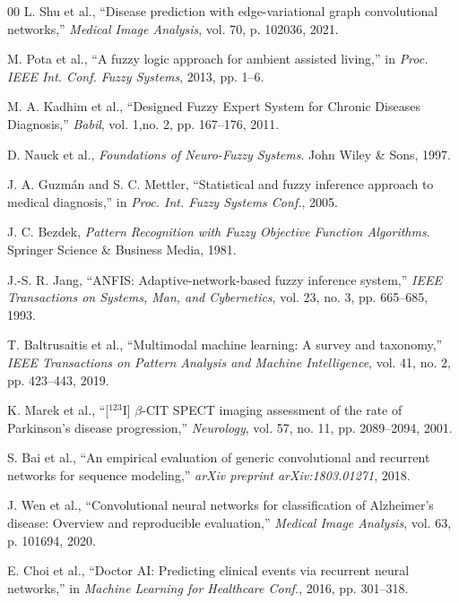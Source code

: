 \documentclass[journal,twoside,web]{ieeecolor}
\begin{document}
\begin{thebibliography}{00}
L. Shu et al., ``Disease prediction with edge-variational graph convolutional networks,'' \textit{Medical Image Analysis}, vol. 70, p. 102036, 2021.

M. Pota et al., ``A fuzzy logic approach for ambient assisted living,'' in \textit{Proc. IEEE Int. Conf. Fuzzy Systems}, 2013, pp. 1--6.

M. A. Kadhim et al., ``Designed Fuzzy Expert System for Chronic Diseases Diagnosis,'' \textit{Babil}, vol. 1,no. 2, pp. 167--176, 2011.

D. Nauck et al., \textit{Foundations of Neuro-Fuzzy Systems}. John Wiley \& Sons, 1997.

J. A. Guzm\'{a}n and S. C. Mettler, ``Statistical and fuzzy inference approach to medical diagnosis,'' in \textit{Proc. Int. Fuzzy Systems Conf.}, 2005.

J. C. Bezdek, \textit{Pattern Recognition with Fuzzy Objective Function Algorithms}. Springer Science \& Business Media, 1981.

J.-S. R. Jang, ``ANFIS: Adaptive-network-based fuzzy inference system,'' \textit{IEEE Transactions on Systems, Man, and Cybernetics}, vol. 23, no. 3, pp. 665--685, 1993.

T. Baltrusaitis et al., ``Multimodal machine learning: A survey and taxonomy,'' \textit{IEEE Transactions on Pattern Analysis and Machine Intelligence}, vol. 41, no. 2, pp. 423--443, 2019.

K. Marek et al., ``[$^{123}$I] $\beta$-CIT SPECT imaging assessment of the rate of Parkinson's disease progression,'' \textit{Neurology}, vol. 57, no. 11, pp. 2089--2094, 2001.

S. Bai et al., ``An empirical evaluation of generic convolutional and recurrent networks for sequence modeling,'' \textit{arXiv preprint arXiv:1803.01271}, 2018.

J. Wen et al., ``Convolutional neural networks for classification of Alzheimer's disease: Overview and reproducible evaluation,'' \textit{Medical Image Analysis}, vol. 63, p. 101694, 2020.

E. Choi et al., ``Doctor AI: Predicting clinical events via recurrent neural networks,'' in \textit{Machine Learning for Healthcare Conf.}, 2016, pp. 301--318.


\end{thebibliography}
\end{document}
